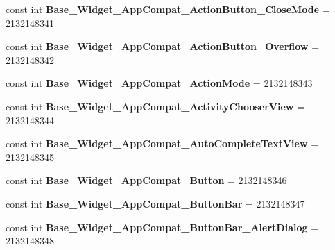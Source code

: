 \begin{DoxyCompactItemize}
\mbox{\label{classst_delivery_1_1_resource_1_1_style_aadc1ba95c38add1d51f2e79299521b6a}} 
const int {\bfseries Base\+\_\+\+Widget\+\_\+\+App\+Compat\+\_\+\+Action\+Button\+\_\+\+Close\+Mode} = 2132148341
\item 
\mbox{\label{classst_delivery_1_1_resource_1_1_style_addf91e71007ff695c1a2465429443bcd}} 
const int {\bfseries Base\+\_\+\+Widget\+\_\+\+App\+Compat\+\_\+\+Action\+Button\+\_\+\+Overflow} = 2132148342
\item 
\mbox{\label{classst_delivery_1_1_resource_1_1_style_a9fd311b3f09f37668ff03c9cdda6906a}} 
const int {\bfseries Base\+\_\+\+Widget\+\_\+\+App\+Compat\+\_\+\+Action\+Mode} = 2132148343
\item 
\mbox{\label{classst_delivery_1_1_resource_1_1_style_a4654852ec184d5c73157c4a659642c12}} 
const int {\bfseries Base\+\_\+\+Widget\+\_\+\+App\+Compat\+\_\+\+Activity\+Chooser\+View} = 2132148344
\item 
\mbox{\label{classst_delivery_1_1_resource_1_1_style_a1384b78d080084abe75c694f5d06d1f4}} 
const int {\bfseries Base\+\_\+\+Widget\+\_\+\+App\+Compat\+\_\+\+Auto\+Complete\+Text\+View} = 2132148345
\item 
\mbox{\label{classst_delivery_1_1_resource_1_1_style_a7512a39bc606bcea84ae3b5237d8c4e1}} 
const int {\bfseries Base\+\_\+\+Widget\+\_\+\+App\+Compat\+\_\+\+Button} = 2132148346
\item 
\mbox{\label{classst_delivery_1_1_resource_1_1_style_a93e33c91ffa93818be239f818166f40b}} 
const int {\bfseries Base\+\_\+\+Widget\+\_\+\+App\+Compat\+\_\+\+Button\+Bar} = 2132148347
\item 
\mbox{\label{classst_delivery_1_1_resource_1_1_style_a42faa176256706f62df33255e018e030}} 
const int {\bfseries Base\+\_\+\+Widget\+\_\+\+App\+Compat\+\_\+\+Button\+Bar\+\_\+\+Alert\+Dialog} = 2132148348
\item 

\end{DoxyCompactItemize}
